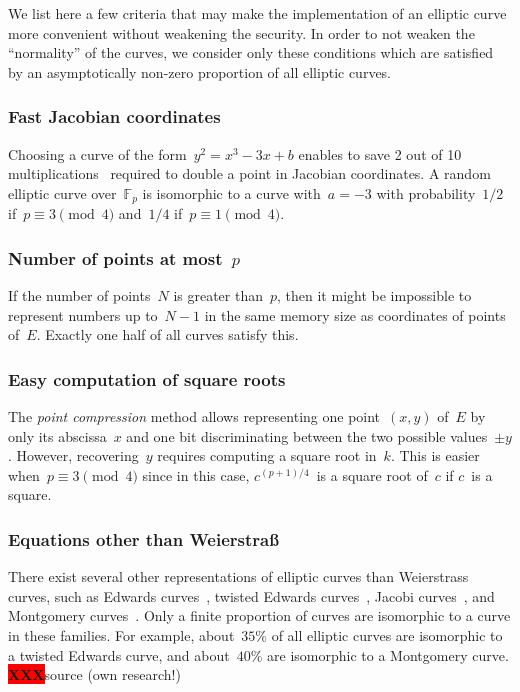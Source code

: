 \documentclass{article}
\def\F{\mathbb{F}}
\def\XXX{{\colorbox{red}{{\color{white}\bfseries XXX}}}}
\begin{document}
We list here a few criteria that
may make the implementation of an elliptic curve more convenient
without weakening the security.
In order to not weaken the ``normality'' of the curves,
we consider only these conditions which are satisfied
by an asymptotically non-zero proportion of all elliptic curves.

\subsubsection{Fast Jacobian coordinates}

Choosing a curve of the form~$y^2 = x^3 - 3 x + b$
enables to save 2 out of 10 multiplications~\cite{ieeep1363}
required to double a point in Jacobian coordinates.
A random elliptic curve over~$\F_p$
is isomorphic to a curve with~$a = -3$
with probability~$1/2$ if~$p ≡ 3 \pmod{4}$ and~$1/4$ if~$p ≡ 1 \pmod{4}$.

\subsubsection{Number of points at most~$p$}

If the number of points~$N$ is greater than~$p$,
then it might be impossible to represent numbers up to~$N-1$
in the same memory size as coordinates of points of~$E$.
Exactly one half of all curves satisfy this.

\subsubsection{Easy computation of square roots}

The \emph{point compression} method allows representing
one point~$(x,y)$ of~$E$ by only its abscissa~$x$ and
one bit discriminating between the two possible values~$±y$.
However, recovering~$y$ requires computing a square root in~$k$.
This is easier when~$p ≡ 3 \pmod{4}$ since
in this case, $c^{(p+1)/4}$~is a square root of~$c$ if $c$~is a square.

\subsubsection{Equations other than Weierstraß}

There exist several other representations of elliptic curves
than Weierstrass curves, such as
Edwards curves~\cite{ams2007edwards},
twisted Edwards curves~\cite{africa2008bbjl},
Jacobi curves~\cite{aaaaec2003bj},
and Montgomery curves~\cite{mathcomp1987montgomery}.
Only a finite proportion of curves are isomorphic
to a curve in these families.
For example, about~$35\%$ of all elliptic curves
are isomorphic to a twisted Edwards curve,
and about~$40\%$ are isomorphic to a Montgomery curve.
\XXX source (own research!)
\end{document}
